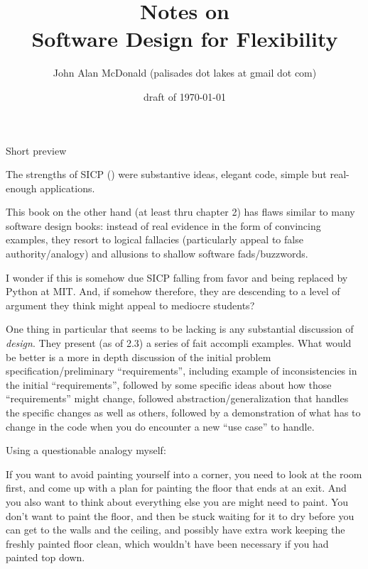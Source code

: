 \documentclass[12pt]{PalisadesLakesBook}
\title{Notes on\\
 Software Design for Flexibility}
\author{John Alan McDonald 
(palisades dot lakes at gmail dot com)}
\date{draft of \today}
\begin{document}
\maketitle
{}
\def\sharedFolder{../../shared/}
\begin{plSection}{Short preview}


The strengths of SICP 
()
were substantive ideas, elegant code,
simple but real-enough applications.

This book on the other hand (at least thru chapter 2)
has flaws similar to many software design books:
instead of real evidence in the form of convincing examples,
they resort to logical fallacies (particularly appeal to
false authority/analogy)
and allusions to shallow software fads/buzzwords.

I wonder if this is somehow due SICP falling from favor
and being replaced by Python at MIT.
And, if somehow therefore, they are descending to a level of
argument they think might appeal to mediocre students?

One thing in particular that seems to be lacking is 
any substantial discussion of \emph{design}.
They present (as of 2.3) a series of fait accompli examples.
What would be better is a more in depth discussion 
of the initial problem specification/preliminary ``requirements'',
including example of inconsistencies 
in the initial ``requirements'',
followed by some specific ideas about how those ``requirements''
might change,
followed abstraction/generalization that handles the specific
changes as well as others,
followed by a demonstration of what has to change in the code
when you do encounter a new ``use case'' to handle.

Using a questionable analogy myself:

If you want to avoid painting yourself into a corner,
you need to look at the room first, and come up with a plan
for painting the floor that ends at an exit.
And you also want to think about everything else 
you are might need to paint. 
You don't want to paint the floor,
and then be stuck waiting for it to dry before you can get
to the walls and the ceiling,
and possibly have extra work keeping the freshly painted floor
clean, which wouldn't have been necessary if you had painted
top down.

\end{plSection}%
\end{document}
